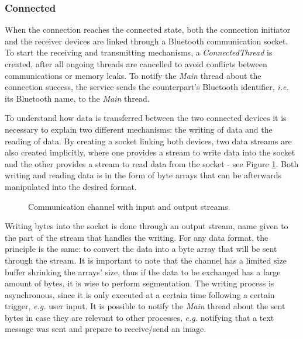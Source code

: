 \subsubsection{Connected}
\label{subsubsec:connected}

When the connection reaches the connected state, both the connection initiator and the receiver devices are linked through a Bluetooth communication socket. To start the receiving and transmitting mechanisms, a \textit{ConnectedThread} is created, after all ongoing threads are cancelled to avoid conflicts between communications or memory leaks. To notify the \textit{Main} thread about the connection success, the service sends the counterpart's Bluetooth identifier, \textit{i.e.} its Bluetooth name, to the \textit{Main} thread.

To understand how data is transferred between the two connected devices it is necessary to explain two different mechanisms: the writing of data and the reading of data. By creating a socket linking both devices, two data streams are also created implicitly, where one provides a stream to write data into the socket and the other provides a stream to read data from the socket - see Figure \ref{fig:inoutstreams}. Both writing and reading data is in the form of byte arrays that can be afterwards manipulated into the desired format.

\begin{figure}[ht]
	\noindent{}
	\caption{\label{fig:inoutstreams} Communication channel with input and output streams.}
\end{figure}

Writing bytes into the socket is done through an output stream, name given to the part of the stream that handles the writing. For any data format, the principle is the same: to convert the data into a byte array that will be sent through the stream. It is important to note that the channel has a limited size buffer shrinking the arrays' size, thus if the data to be exchanged has a large amount of bytes, it is wise to perform segmentation. The writing process is asynchronous, since it is only executed at a certain time following a certain trigger, \textit{e.g.} user input. It is possible to notify the \textit{Main} thread about the sent bytes in case they are relevant to other processes, \textit{e.g.} notifying that a text message was sent and prepare to receive/send an image.

